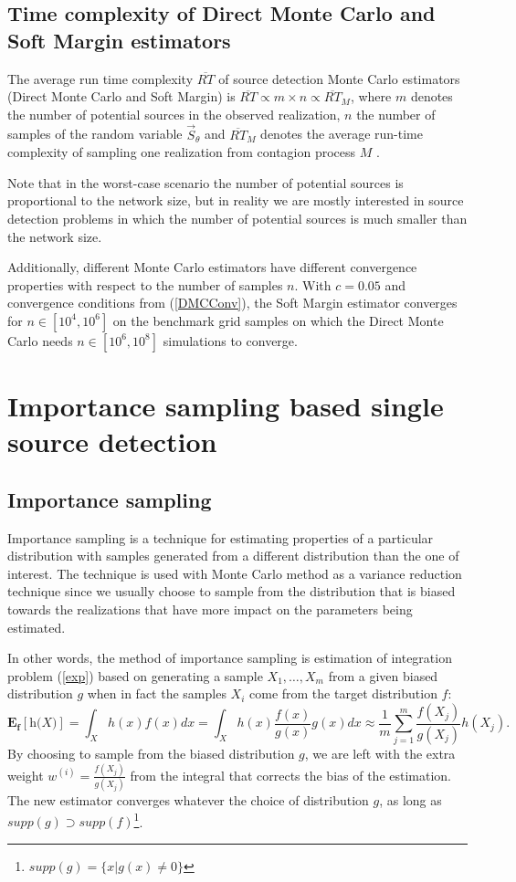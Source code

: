 \documentclass[times, utf8, diplomski]{fer}
\begin{document}
\section{Time complexity of Direct Monte Carlo and Soft Margin estimators}
The average run time complexity $\overline{RT}$ of source detection Monte Carlo estimators (Direct Monte Carlo and Soft Margin) is $\overline{RT} \propto m \times n \propto \overline{RT}_{M}$, where $m$ denotes the number of potential sources in the observed  realization, $n$ the number of samples of the random variable $\vec S_{\theta}$  and $\overline{RT}_M$ denotes the average run-time complexity of sampling one realization from contagion process $M$ \cite{Nino}.

Note that in the worst-case scenario the number of potential sources is proportional to the network size, but in reality we are mostly interested in source detection problems in which the number of potential sources is much smaller than the network size. 

Additionally, different Monte Carlo estimators have different convergence properties with respect to the number of samples $n$. With $c = 0.05$ and convergence conditions from (\ref{DMCConv}), the Soft Margin estimator converges for $n \in [10^4, 10^6]$ on the benchmark grid samples on which the Direct Monte Carlo needs $n\in[10^6, 10^8]$ simulations to converge.

\chapter{Importance sampling based single source detection}
\label{IS}

\section{Importance sampling}

Importance sampling is a technique for estimating properties of a particular distribution with samples generated from a different distribution than the one of interest. The technique is used with Monte Carlo method as a variance reduction technique since we usually choose to sample from the distribution that is biased towards the realizations that have more impact on the parameters being estimated.

In other words, the method of importance sampling is estimation of integration problem (\ref{exp}) based on generating a sample $X_1, \ldots, X_m$ from a given biased distribution $\textit{g}$ when in fact the samples $X_i$ come from the target distribution $\textit{f}$:
\begin{equation}
\mathbf{E_f[\textit{h(X)}]} = \int_{X} h(x) f(x) dx = \int_{X} h(x) \frac{f(x)}{g(x)} g(x) dx \approx \frac{1}{m} \sum_{j = 1}^{m} \frac{f(X_j)}{g(X_j)} h(X_j).
\end{equation}
By choosing to sample from the biased distribution $g$, we are left with the extra weight $w^{(i)} = \frac{f(X_j)}{g(X_j)}$ from the integral that corrects the bias of the estimation. The new estimator converges whatever the choice of distribution $g$, as long as $supp(g) \supset supp(f)$\footnote{$supp(g) = \{x | g(x) \neq 0\}$}. %
\end{document}
